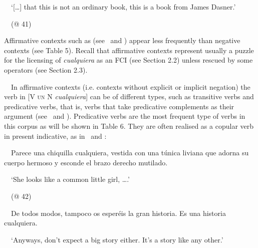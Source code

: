 \begin{styleStandard}
\ \ ‘[…] that this is not an ordinary book, this is a book from James Dasner.’
\end{styleStandard}

\begin{styleStandard}
\ \ (@ 41)
\end{styleStandard}

\begin{styleStandard}
Affirmative contexts such as (see \ and ) appear less frequently than negative contexts (see Table 5). Recall that affirmative contexts represent usually a puzzle for the licensing of \textit{cualquiera} as an FCI (see Section 2.2) unless rescued by some operators (see Section 2.3). 
\end{styleStandard}

\begin{styleStandard}
\ \ In affirmative contexts (i.e. contexts without explicit or implicit negation) the verb in [V \textsc{un} N \textit{cualquiera}] can be of different types, such as transitive verbs and predicative verbs, that is, verbs that take predicative complements as their argument (see \ and ). Predicative verbs are the most frequent type of verbs in this corpus as will be shown in Table 6. They are often realised as a copular verb in present indicative, as in \ and :
\end{styleStandard}

\begin{styleStandard}
\label{bkm:Ref42868883}\ \ Parece una chiquilla cualquiera, vestida con una túnica liviana que adorna su cuerpo hermoso y esconde el brazo derecho mutilado.
\end{styleStandard}

\begin{styleStandard}
\ \ ‘She looks like a common little girl, ….’ 
\end{styleStandard}

\begin{styleStandard}
\ \ (@ 42)
\end{styleStandard}

\begin{styleStandard}
\label{bkm:Ref42868888}\ \ De todos modos, tampoco os esperéis la gran historia. Es una historia cualquiera.
\end{styleStandard}

\begin{styleStandard}
\ \ ‘Anyways, don’t expect a big story either. It’s a story like any other.’
\end{styleStandard}

